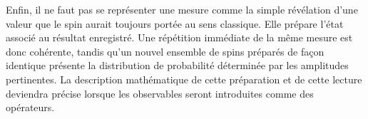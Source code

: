 \begin{classroomqa}
\end{classroomqa}

Enfin, il ne faut pas se représenter une mesure comme la simple révélation d’une valeur que le spin aurait toujours portée au sens classique. Elle prépare l’état associé au résultat enregistré. Une répétition immédiate de la même mesure est donc cohérente, tandis qu’un nouvel ensemble de spins préparés de façon identique présente la distribution de probabilité déterminée par les amplitudes pertinentes. La description mathématique de cette préparation et de cette lecture deviendra précise lorsque les observables seront introduites comme des opérateurs.